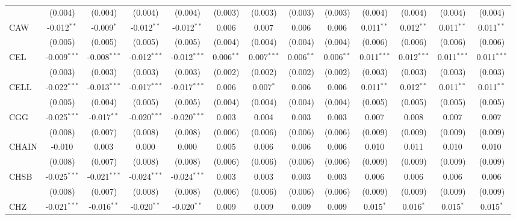 \begin{table}[!htbp]
\begin{tabular}{@{\extracolsep{5pt}}lcccccccccccc}
  & (0.004) & (0.004) & (0.004) & (0.004) & (0.003) & (0.003) & (0.003) & (0.003) & (0.004) & (0.004) & (0.004) & (0.004) \\
 CAW & -0.012$^{**}$ & -0.009$^{*}$ & -0.012$^{**}$ & -0.012$^{**}$ & 0.006$^{}$ & 0.007$^{}$ & 0.006$^{}$ & 0.006$^{}$ & 0.011$^{**}$ & 0.012$^{**}$ & 0.011$^{**}$ & 0.011$^{**}$ \\
  & (0.005) & (0.005) & (0.005) & (0.005) & (0.004) & (0.004) & (0.004) & (0.004) & (0.006) & (0.006) & (0.006) & (0.006) \\
 CEL & -0.009$^{***}$ & -0.008$^{***}$ & -0.012$^{***}$ & -0.012$^{***}$ & 0.006$^{**}$ & 0.007$^{***}$ & 0.006$^{**}$ & 0.006$^{**}$ & 0.011$^{***}$ & 0.012$^{***}$ & 0.011$^{***}$ & 0.011$^{***}$ \\
  & (0.003) & (0.003) & (0.003) & (0.003) & (0.002) & (0.002) & (0.002) & (0.002) & (0.003) & (0.003) & (0.003) & (0.003) \\
 CELL & -0.022$^{***}$ & -0.013$^{***}$ & -0.017$^{***}$ & -0.017$^{***}$ & 0.006$^{}$ & 0.007$^{*}$ & 0.006$^{}$ & 0.006$^{}$ & 0.011$^{**}$ & 0.012$^{**}$ & 0.011$^{**}$ & 0.011$^{**}$ \\
  & (0.005) & (0.004) & (0.005) & (0.005) & (0.004) & (0.004) & (0.004) & (0.004) & (0.005) & (0.005) & (0.005) & (0.005) \\
 CGG & -0.025$^{***}$ & -0.017$^{**}$ & -0.020$^{***}$ & -0.020$^{***}$ & 0.003$^{}$ & 0.004$^{}$ & 0.003$^{}$ & 0.003$^{}$ & 0.007$^{}$ & 0.008$^{}$ & 0.007$^{}$ & 0.007$^{}$ \\
  & (0.008) & (0.007) & (0.008) & (0.008) & (0.006) & (0.006) & (0.006) & (0.006) & (0.009) & (0.009) & (0.009) & (0.009) \\
 CHAIN & -0.010$^{}$ & 0.003$^{}$ & 0.000$^{}$ & 0.000$^{}$ & 0.005$^{}$ & 0.006$^{}$ & 0.006$^{}$ & 0.006$^{}$ & 0.010$^{}$ & 0.011$^{}$ & 0.010$^{}$ & 0.010$^{}$ \\
  & (0.008) & (0.007) & (0.008) & (0.008) & (0.006) & (0.006) & (0.006) & (0.006) & (0.009) & (0.009) & (0.009) & (0.009) \\
 CHSB & -0.025$^{***}$ & -0.021$^{***}$ & -0.024$^{***}$ & -0.024$^{***}$ & 0.003$^{}$ & 0.003$^{}$ & 0.003$^{}$ & 0.003$^{}$ & 0.006$^{}$ & 0.006$^{}$ & 0.006$^{}$ & 0.006$^{}$ \\
  & (0.008) & (0.007) & (0.008) & (0.008) & (0.006) & (0.006) & (0.006) & (0.006) & (0.009) & (0.009) & (0.009) & (0.009) \\
 CHZ & -0.021$^{***}$ & -0.016$^{**}$ & -0.020$^{**}$ & -0.020$^{**}$ & 0.009$^{}$ & 0.009$^{}$ & 0.009$^{}$ & 0.009$^{}$ & 0.015$^{*}$ & 0.016$^{*}$ & 0.015$^{*}$ & 0.015$^{*}$ \\

\end{tabular}
\end{table}
